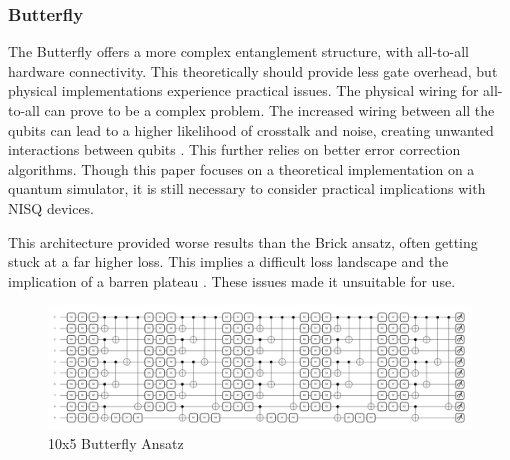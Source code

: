 \documentclass[12pt]{article}
\newcommand{\newp}
    {
    \vskip 0.5cm 
  }
\numberwithin{equation}{section}
\begin{document}
\subsubsection{Butterfly}
The Butterfly offers a more complex entanglement structure, with all-to-all hardware 
connectivity. This theoretically should provide less gate overhead, but physical 
implementations experience practical issues. The physical wiring for all-to-all 
can prove to be a complex problem. The increased wiring between all the qubits 
can lead to a higher likelihood of crosstalk and noise, creating unwanted interactions 
between qubits \autocite{preskill_2018_quantum}. This further relies on better error correction algorithms. Though 
this paper focuses on a theoretical implementation on a quantum simulator, it 
is still necessary to consider practical implications with NISQ devices. 
\newp
This architecture provided worse results than the Brick ansatz, often getting 
stuck at a far higher loss. This implies a difficult loss landscape and the 
implication of a barren plateau \autocite{cherrat_2024_quantum}. These issues made it unsuitable for use. 
\begin{figure}[h!]
  \centering 
  \includegraphics[width=\linewidth]{ten5butterfly.png}
  \caption{10x5 Butterfly Ansatz}
  \label{fig:butterfly}
\end{figure}
\newpage
\end{document}
